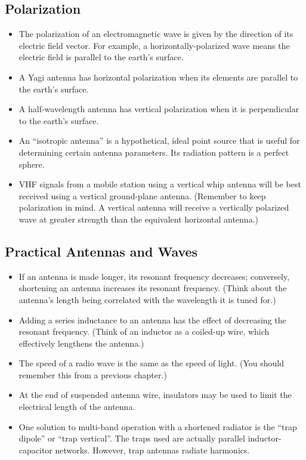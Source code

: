 \documentclass[letterpaper,12pt]{scrartcl}
\begin{document}
\subsection{Polarization}

\begin{itemize}
\item The polarization of an electromagnetic wave is given by the direction of its electric field vector.
For example, a horizontally-polarized wave means the electric field is parallel to the earth's surface.
\item A Yagi antenna has horizontal polarization when its elements are parallel to the earth's surface.
\item A half-wavelength antenna has vertical polarization when it is perpendicular to the earth's surface.
\item An ``isotropic antenna'' is a hypothetical, ideal point source that is useful for determining certain antenna parameters.
Its radiation pattern is a perfect sphere.
\item VHF signals from a mobile station using a vertical whip antenna will be best received using a vertical ground-plane antenna.
(Remember to keep polarization in mind. A vertical antenna will receive a vertically polarized wave at greater strength
than the equivalent horizontal antenna.)
\end{itemize}

\subsection{Practical Antennas and Waves}

\begin{itemize}
\item If an antenna is made longer, its resonant frequency decreases; conversely, shortening an antenna increases its resonant frequency.
(Think about the antenna's length being correlated with the wavelength it is tuned for.)
\item Adding a series inductance to an antenna has the effect of decreasing the resonant frequency.
(Think of an inductor as a coiled-up wire, which effectively lengthens the antenna.)
\item The speed of a radio wave is the same as the speed of light. (You should remember this from a previous chapter.)
\item At the end of suspended antenna wire, insulators may be used to limit the electrical length of the antenna.
\item One solution to multi-band operation with a shortened radiator is the ``trap dipole'' or ``trap vertical''.
The traps used are actually parallel inductor-capacitor networks.
However, trap antennas radiate harmonics.
\end{itemize}
\end{document}
